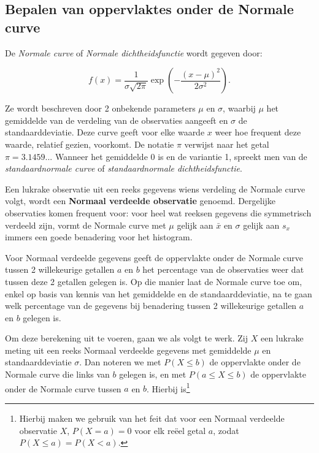 \documentclass[12pt,dutch,coursenotes]{book}
\let\rmarkdownfootnote\footnote%
\def\footnote{\protect\rmarkdownfootnote}
\theoremstyle{definition}
\theoremstyle{definition}
\theoremstyle{definition}
\theoremstyle{remark}
\begin{document}
\subsection{Bepalen van oppervlaktes onder de Normale
curve}\label{subsec:normalcalc}

De \emph{Normale curve} of \emph{Normale dichtheidsfunctie} wordt
gegeven door:

\begin{equation*}
f(x) = \frac{1}{\sigma \sqrt{2 \pi} } \exp \left ( - \frac{ (x - \mu)^2 }{ 2
\sigma^2} \right ).
\end{equation*}

Ze wordt beschreven door 2 onbekende parameters \(\mu\) en \(\sigma\),
waarbij \(\mu\) het gemiddelde van de verdeling van de observaties
aangeeft en \(\sigma\) de standaarddeviatie. Deze curve geeft voor elke
waarde \(x\) weer hoe frequent deze waarde, relatief gezien, voorkomt.
De notatie \(\pi\) verwijst naar het getal \(\pi=3.1459...\) Wanneer het
gemiddelde 0 is en de variantie 1, spreekt men van de
\emph{standaardnormale curve} of \emph{standaardnormale
dichtheidsfunctie}.

Een lukrake observatie uit een reeks gegevens wiens verdeling de Normale
curve volgt, wordt een \textbf{Normaal verdeelde observatie} genoemd.
Dergelijke observaties komen frequent voor: voor heel wat reeksen
gegevens die symmetrisch verdeeld zijn, vormt de Normale curve met
\(\mu\) gelijk aan \(\bar x\) en \(\sigma\) gelijk aan \(s_x\) immers
een goede benadering voor het histogram.

Voor Normaal verdeelde gegevens geeft de oppervlakte onder de Normale
curve tussen 2 willekeurige getallen \(a\) en \(b\) het percentage van
de observaties weer dat tussen deze 2 getallen gelegen is. Op die manier
laat de Normale curve toe om, enkel op basis van kennis van het
gemiddelde en de standaarddeviatie, na te gaan welk percentage van de
gegevens bij benadering tussen 2 willekeurige getallen \(a\) en \(b\)
gelegen is.

Om deze berekening uit te voeren, gaan we als volgt te werk. Zij \(X\)
een lukrake meting uit een reeks Normaal verdeelde gegevens met
gemiddelde \(\mu\) en standaarddeviatie \(\sigma\). Dan noteren we met
\(P(X\leq b)\) de oppervlakte onder de Normale curve die links van \(b\)
gelegen is, en met \(P(a\leq X\leq b)\) de oppervlakte onder de Normale
curve tussen \(a\) en \(b\). Hierbij is\footnote{Hierbij maken we
  gebruik van het feit dat voor een Normaal verdeelde observatie \(X\),
  \(P(X=a)=0\) voor elk reëel getal \(a\), zodat \(P(X\leq a)=P(X<a)\).}
\end{document}
